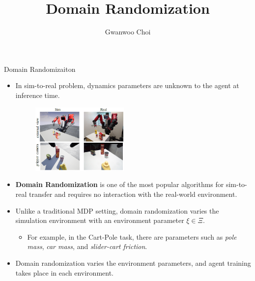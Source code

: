 \documentclass{beamer}
\title{Domain Randomization}
\author{Gwanwoo Choi}
\newcommand{\tb}[1]{\textbf{#1}}
\newcommand{\ti}[1]{\textit{#1}}
\begin{document}

\begin{frame}
    \titlepage
\end{frame}





\begin{frame}{Domain Randomizaiton}
    \begin{itemize}
        \item In sim-to-real problem, dynamics parameters are unknown to the agent at inference time.
        \begin{figure}
            \includegraphics[width=0.45\textwidth]{sim2real.png}
        \end{figure}
        \item \tb{Domain Randomization} is one of the most popular algorithms for sim-to-real transfer and requires no interaction with the real-world environment.
        \item Unlike a traditional MDP setting, domain randomization varies the simulation environment with an environment parameter $\xi \in \Xi$.
        \begin{itemize}
            \item For example, in the Cart-Pole task, there are parameters such as \ti{pole mass}, \ti{car mass}, and \ti{slider-cart friction}.
        \end{itemize}
        \item Domain randomization varies the environment parameters, and agent training takes place in each environment.
    \end{itemize}
\end{frame}
\end{document}
